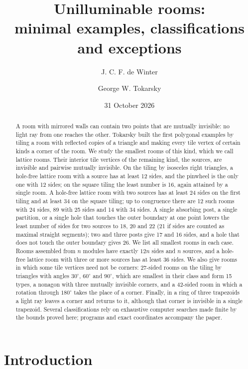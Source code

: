 \documentclass[11pt,a4paper]{article}
\title{Unilluminable rooms:\\[2pt] minimal examples, classifications and exceptions}
\author{J. C. F. de Winter \and George W. Tokarsky}
\date{31 October 2026}
\theoremstyle{plain}
\theoremstyle{definition}
\theoremstyle{remark}
\newcommand{\dg}{^\circ}
\numberwithin{equation}{section}
\begin{document}
\maketitle

\begin{abstract}
A room with mirrored walls can contain two points that are mutually invisible: no light ray from one reaches the other. Tokarsky built the first polygonal examples by tiling a room with reflected copies of a triangle and making every tile vertex of certain kinds a corner of the room. We study the smallest rooms of this kind, which we call lattice rooms. Their interior tile vertices of the remaining kind, the sources, are invisible and pairwise mutually invisible. On the tiling by isosceles right triangles, a hole-free lattice room with a source has at least 12 sides, and the pinwheel is the only one with 12 sides; on the square tiling the least number is 16, again attained by a single room. A hole-free lattice room with two sources has at least 24 sides on the first tiling and at least 34 on the square tiling; up to congruence there are 12 such rooms with 24 sides, 89 with 25 sides and 14 with 34 sides. A single absorbing post, a single partition, or a single hole that touches the outer boundary at one point lowers the least number of sides for two sources to 18, 20 and 22 (21 if sides are counted as maximal straight segments); two and three posts give 17 and 16 sides, and a hole that does not touch the outer boundary gives 26. We list all smallest rooms in each case. Rooms assembled from $n$ modules have exactly $12n$ sides and $n$ sources, and a hole-free lattice room with three or more sources has at least 36 sides. We also give rooms in which some tile vertices need not be corners: 27-sided rooms on the tiling by triangles with angles $30\dg$, $60\dg$ and $90\dg$, which are smallest in their class and form 15 types, a nonagon with three mutually invisible corners, and a 42-sided room in which a rotation through $180\dg$ takes the place of a corner. Finally, in a ring of three trapezoids a light ray leaves a corner and returns to it, although that corner is invisible in a single trapezoid. Several classifications rely on exhaustive computer searches made finite by the bounds proved here; programs and exact coordinates accompany the paper.
\end{abstract}

\section{Introduction}\label{sec:intro}
\end{document}
